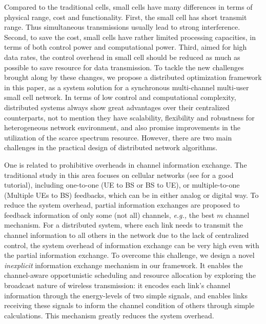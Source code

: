 \documentclass[conference]{IEEEtran}
\newcommand{\eg}{\emph{e.g., }}
\begin{document}
Compared to the traditional cells, small cells have many differences in terms of physical range, cost and functionality. First, the small cell has short transmit range. Thus simultaneous transmissions usually lead to strong interference. Second, to save the cost, small cells have rather limited processing capacities, in terms of both control power and computational power. Third, aimed for high data rates, the control overhead in small cell should be reduced as much as possible to save resource for data transmission.
To tackle the new challenges brought along by these changes,
we propose a distributed optimization framework in this paper, as a system solution for a synchronous multi-channel multi-user small cell network.
In terms of low control and computational complexity, distributed systems always show great advantages over their centralized counterparts, not to mention they have scalability, flexibility and robustness for heterogeneous network environment, and also promise improvements in the utilization of the scarce spectrum resource. However, there are two main challenges in the practical design of distributed network algorithms.

One is related to prohibitive overheads in channel information exchange. The traditional study in this area focuses on cellular networks (see \cite{love2008overview} for a good tutorial), including one-to-one (UE to BS or BS to UE), or multiple-to-one (Multiple UEs to BS) feedbacks, which can be in either analog or digital way. To reduce the system overhead, partial information exchanges\cite{love2008overview,Huang2012sum,Huang2013analytical} are proposed to feedback information of only some (not all) channels, \eg the best $m$ channel mechanism. For a distributed system, where each link needs to transmit the channel information to all others in the network due to the lack of centralized control, the system overhead of information exchange can be very high even with the partial information exchange. To overcome this challenge, we design a novel \emph{inexplicit} information exchange mechanism in our framework. It enables the channel-aware opportunistic scheduling and resource allocation by exploring the broadcast nature of wireless transmission: it encodes each link's channel information through the energy-levels of two simple signals, and enables links receiving these signals to inform the channel condition of others through simple calculations. This mechanism greatly reduces the system overhead.
\end{document}
